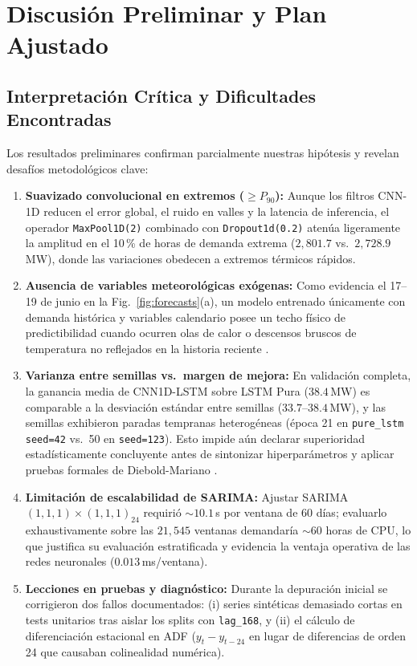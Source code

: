 \documentclass[conference]{IEEEtran}
\begin{document}
\section{Discusión Preliminar y Plan Ajustado}

\subsection{Interpretación Crítica y Dificultades Encontradas}
Los resultados preliminares confirman parcialmente nuestras hipótesis y revelan desafíos metodológicos clave:
\begin{enumerate}
    \item \textbf{Suavizado convolucional en extremos ($\ge P_{90}$):} Aunque los filtros CNN-1D reducen el error global, el ruido en valles y la latencia de inferencia, el operador \texttt{MaxPool1D(2)} combinado con \texttt{Dropout1d(0.2)} atenúa ligeramente la amplitud en el 10\,\% de horas de demanda extrema ($2{,}801.7$ vs.\ $2{,}728.9$\,MW), donde las variaciones obedecen a extremos térmicos rápidos.
    \item \textbf{Ausencia de variables meteorológicas exógenas:} Como evidencia el 17--19 de junio en la Fig.~\ref{fig:forecasts}(a), un modelo entrenado únicamente con demanda histórica y variables calendario posee un techo físico de predictibilidad cuando ocurren olas de calor o descensos bruscos de temperatura no reflejados en la historia reciente \cite{lim2021time,ahajjam2022experimental}.
    \item \textbf{Varianza entre semillas vs.\ margen de mejora:} En validación completa, la ganancia media de CNN1D-LSTM sobre LSTM Pura ($38.4$\,MW) es comparable a la desviación estándar entre semillas ($33.7\text{--}38.4$\,MW), y las semillas exhibieron paradas tempranas heterogéneas (época 21 en \texttt{pure\_lstm} \texttt{seed=42} vs.\ 50 en \texttt{seed=123}). Esto impide aún declarar superioridad estadísticamente concluyente antes de sintonizar hiperparámetros y aplicar pruebas formales de Diebold-Mariano \cite{diebold1995comparing}.
    \item \textbf{Limitación de escalabilidad de SARIMA:} Ajustar SARIMA$(1,1,1)\times(1,1,1)_{24}$ requirió $\sim 10.1$\,s por ventana de 60 días; evaluarlo exhaustivamente sobre las $21{,}545$ ventanas demandaría $\sim 60$ horas de CPU, lo que justifica su evaluación estratificada y evidencia la ventaja operativa de las redes neuronales ($0.013$\,ms/ventana).
    \item \textbf{Lecciones en pruebas y diagnóstico:} Durante la depuración inicial se corrigieron dos fallos documentados: (i) series sintéticas demasiado cortas en tests unitarios tras aislar los splits con \texttt{lag\_168}, y (ii) el cálculo de diferenciación estacional en ADF ($y_t - y_{t-24}$ en lugar de diferencias de orden 24 que causaban colinealidad numérica).
\end{enumerate}
\end{document}
